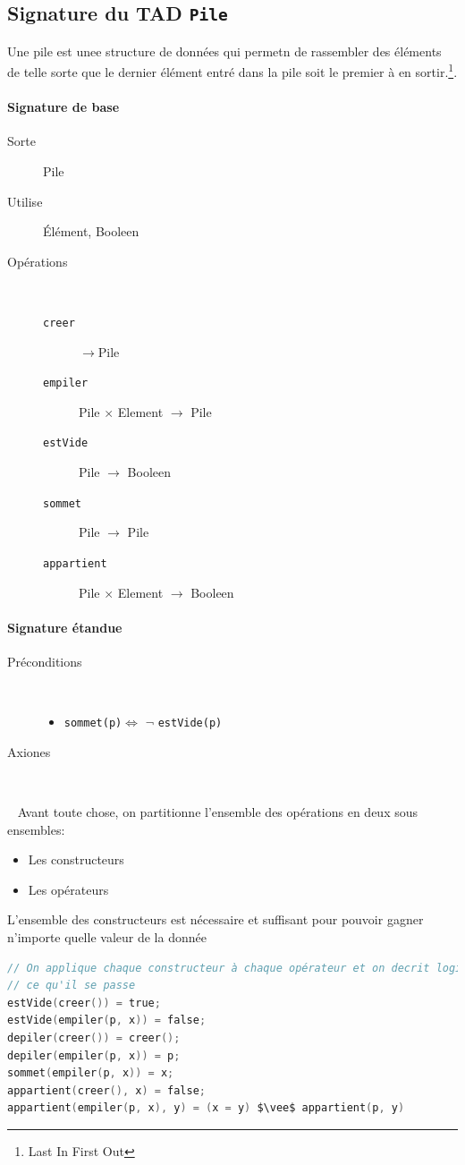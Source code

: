 \subsection{Signature du TAD \texttt{Pile}}\label{pileStatique}
Une pile est unee structure de données qui permetn de rassembler des éléments de telle sorte que le dernier élément entré dans la pile soit le premier à
en sortir.\footnote{Last In First Out}.
\paragraph{Signature de base}
\begin{description}
	\item[Sorte] Pile
	\item[Utilise] Élément, Booleen 
	\item[Opérations]~ 
		\begin{description}
			\item[\texttt{creer}] $\rightarrow$Pile %
			\item[\texttt{empiler}] Pile $\times$ Element $\rightarrow$ Pile
			\item[\texttt{estVide}] Pile $\rightarrow$ Booleen  %
			\item[\texttt{sommet}] Pile $\rightarrow$ Pile
			\item[\texttt{appartient}] Pile $\times$ Element $\rightarrow$ Booleen 
		\end{description}
\end{description}

\paragraph{Signature étandue}
\begin{description}
	\item[Préconditions]~
		\begin{itemize}
			\item \texttt{sommet(p)}$\Leftrightarrow$ $\neg$ \texttt{estVide(p)}
		\end{itemize}
	\item[Axiones]~
\end{description}
~\newline
Avant toute chose, on partitionne l'ensemble des opérations en deux sous ensembles: 
\begin{itemize}
	\item Les constructeurs
	\item Les opérateurs
\end{itemize}
L'ensemble des constructeurs est nécessaire et suffisant pour pouvoir gagner n'importe quelle valeur de la donnée
\begin{lstlisting}[language=C, numbers=none,caption=Opérations du TAD Pile]
// On applique chaque constructeur à chaque opérateur et on decrit logiquement 
// ce qu'il se passe
estVide(creer()) = true;
estVide(empiler(p, x)) = false;
depiler(creer()) = creer();
depiler(empiler(p, x)) = p;
sommet(empiler(p, x)) = x;
appartient(creer(), x) = false;
appartient(empiler(p, x), y) = (x = y) $\vee$ appartient(p, y)
 \end{lstlisting}

